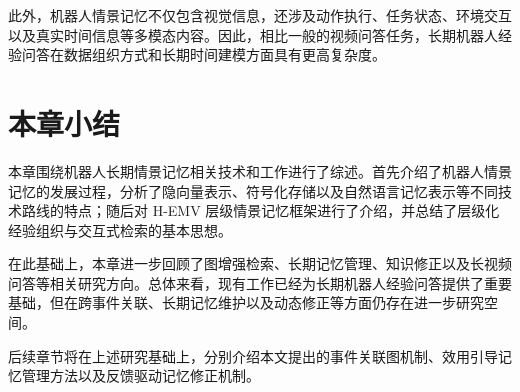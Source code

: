 此外，机器人情景记忆不仅包含视觉信息，还涉及动作执行、任务状态、环境交互以及真实时间信息等多模态内容。因此，相比一般的视频问答任务，长期机器人经验问答在数据组织方式和长期时间建模方面具有更高复杂度。

\section{本章小结}

本章围绕机器人长期情景记忆相关技术和工作进行了综述。首先介绍了机器人情景记忆的发展过程，分析了隐向量表示、符号化存储以及自然语言记忆表示等不同技术路线的特点；随后对 H-EMV 层级情景记忆框架进行了介绍，并总结了层级化经验组织与交互式检索的基本思想。

在此基础上，本章进一步回顾了图增强检索、长期记忆管理、知识修正以及长视频问答等相关研究方向。总体来看，现有工作已经为长期机器人经验问答提供了重要基础，但在跨事件关联、长期记忆维护以及动态修正等方面仍存在进一步研究空间。

后续章节将在上述研究基础上，分别介绍本文提出的事件关联图机制、效用引导记忆管理方法以及反馈驱动记忆修正机制。
